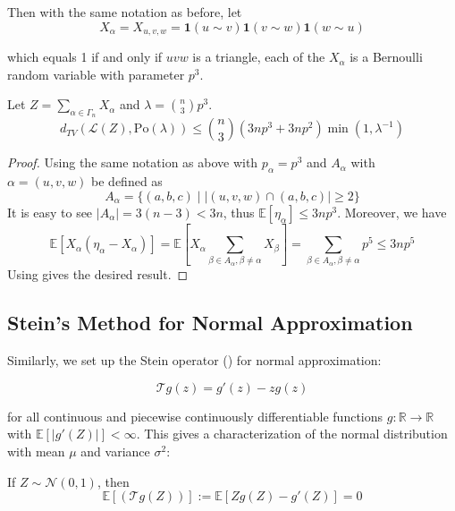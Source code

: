 \documentclass{article}
\begin{document}
Then with the same notation as before, let 
$$
X_{\alpha}=X_{u,v,w} = \mathbf{1}(u\sim v) \mathbf{1}(v\sim w) \mathbf{1}(w\sim u)
$$

which equals 1 if and only if $uvw$ is a triangle, each of the $X_\alpha$ is a Bernoulli random variable with parameter $p^3$. 

\begin{theorem}
    Let $Z = \sum_{\alpha \in \Gamma_n} X_\alpha$ and $\lambda = \binom{n}{3}p^3$.
    \begin{equation*}
        d_{TV}(\mathcal{L}(Z), \text{Po}(\lambda)) \leq \binom{n}{3}(3np^3 + 3np^2) \min (1, \lambda^{-1})
    \end{equation*}
\end{theorem}

\begin{proof}
    Using the same notation as above with $p_\alpha=p^3$ and $A_\alpha$ with $\alpha=(u,v,w)$ be defined as 
    \begin{equation*}
        A_{\alpha} = \{(a,b,c) \mid |(u,v,w)\cap (a,b,c)|\geq 2\}
    \end{equation*}
    It is easy to see $|A_\alpha| = 3(n-3) < 3n$, thus $\mathbb{E}[\eta_\alpha]\leq 3np^3$. Moreover, we have  
    \begin{equation*}
        \mathbb{E}[X_\alpha(\eta_\alpha - X_\alpha)] = \mathbb{E}[X_\alpha \sum_{\beta \in A_\alpha, \beta \neq \alpha} X_\beta] = \sum_{\beta \in A_\alpha, \beta \neq \alpha} p^5 \leq 3np^5
    \end{equation*}
    Using  gives the desired result.
\end{proof}


\subsection{Stein's Method for Normal Approximation}
Similarly, we set up the Stein operator () for normal approximation:  

\begin{equation}\label{eq:stein_operator_normal}
    \mathcal{T}g(z) = g'(z) - zg(z)
\end{equation}

for all continuous and piecewise continuously differentiable functions $g: \mathbb{R} \to \mathbb{R}$ with $\mathbb{E}[|g'(Z)|]<\infty$. This gives a characterization of the normal distribution with mean $\mu$ and variance $\sigma^2$:  

\begin{theorem}\label{thm:stein_operator_normal}
    If $Z\sim \mathcal{N}(0, 1)$, then 
    \begin{equation*}
        \mathbb{E}[(\mathcal{T}g(Z))]:=\mathbb{E}[Zg(Z) - g'(Z)] = 0
    \end{equation*}
\end{theorem}
\end{document}

